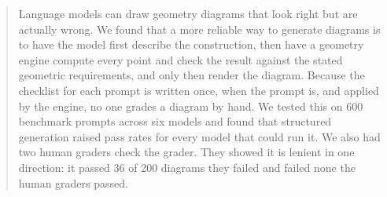 \begin{abstract}
Language models can draw geometry diagrams that look right but are actually
wrong. We found that a more reliable way to generate diagrams is to have the model
first describe the construction, then have a
geometry engine compute every point and check the result against the stated
geometric requirements, and only then render the diagram. Because the
checklist for each prompt is written once, when the prompt is, and applied by
the engine, no one grades a diagram by hand. We tested this on 600 benchmark prompts across six
models and found that structured generation raised pass rates for every model
that could run it. We also had two human graders check the grader. They showed
it is lenient in one direction: it passed 36 of 200 diagrams they failed and
failed none the human graders passed.
\end{abstract}
